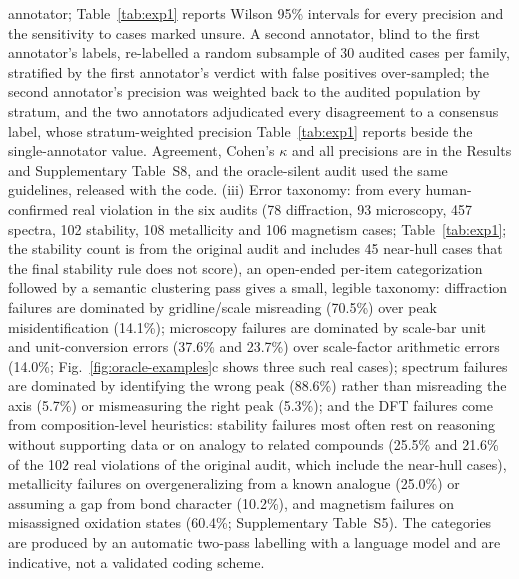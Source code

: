 \documentclass[pdflatex,sn-nature]{sn-jnl}
\newcommand{\rev}[1]{#1}
\newcommand{\rev}[1]{{\color{blue}#1}}
\begin{document}
annotator\rev{; Table~\ref{tab:exp1} reports Wilson 95\% intervals for every precision and the
sensitivity to cases marked unsure. A second annotator, blind to the first annotator's labels,
re-labelled a random subsample of 30 audited cases per family, stratified by the first annotator's
verdict with false positives over-sampled; the second annotator's precision was weighted back to the
audited population by stratum, and the two annotators adjudicated every disagreement to a consensus label,
whose stratum-weighted precision Table~\ref{tab:exp1} reports beside the single-annotator value. Agreement,
Cohen's $\kappa$ and all precisions are in the Results and Supplementary Table~S8, and the oracle-silent audit used the same guidelines, released with
the code.} (iii) Error taxonomy: from \rev{every
human-confirmed real violation in the six audits (78 diffraction, 93 microscopy, 457 spectra,
102 stability, 108 metallicity and 106 magnetism cases; Table~\ref{tab:exp1}; the stability count is from the
original audit and includes 45 near-hull cases that the final stability rule does not score)}, an open-ended per-item categorization followed by a semantic clustering pass
gives a small, legible taxonomy: diffraction failures are dominated by gridline/scale
misreading (70.5\%) over peak misidentification (14.1\%); microscopy failures are
dominated by scale-bar unit and unit-conversion errors (37.6\% and 23.7\%) over scale-factor
arithmetic errors (14.0\%; Fig.~\ref{fig:oracle-examples}c shows three such real cases)\rev{; spectrum
failures are dominated by identifying the wrong peak (88.6\%) rather than misreading the axis (5.7\%)
or mismeasuring the right peak (5.3\%); and the DFT failures come from composition-level
heuristics: stability failures most often rest on reasoning without supporting data or on analogy to
related compounds (25.5\% and 21.6\% \rev{of the 102 real violations of the original audit, which include the
near-hull cases}), metallicity failures on overgeneralizing from a known analogue
(25.0\%) or assuming a gap from bond character (10.2\%), and magnetism failures on misassigned
oxidation states (60.4\%; Supplementary Table~S5). The categories are produced by an automatic two-pass labelling with a
language model and are indicative, not a validated coding scheme}.
\end{document}
